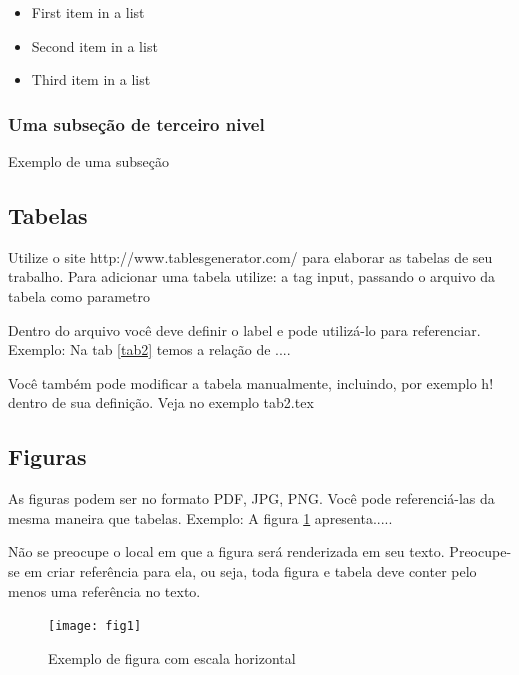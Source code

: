 \documentclass[	DIV=calc,%
							paper=a4,%
							fontsize=12pt,%
							onecolumn]{scrartcl}	 					%
\begin{document}
\begin{itemize}
	\item First item in a list 
	\item Second item in a list 
	\item Third item in a list
\end{itemize}

\subsubsection{Uma subseção de terceiro nivel}

Exemplo de uma subseção

\subsection{Tabelas}

Utilize o site http://www.tablesgenerator.com/ para elaborar as tabelas de seu trabalho.
Para adicionar uma tabela utilize: a tag input, passando o arquivo da tabela como parametro



Dentro do arquivo você deve definir o label e pode utilizá-lo para referenciar. Exemplo:
Na tab \ref{tab2} temos a relação de ....


Você também pode modificar a tabela manualmente, incluindo, por exemplo h! dentro de sua definição. Veja no exemplo tab2.tex

\subsection{Figuras}

As figuras podem ser no formato PDF, JPG, PNG. Você pode referenciá-las da mesma maneira que tabelas. Exemplo: A figura \ref{fig1} apresenta.....

Não se preocupe o local em que a figura será renderizada em seu texto. Preocupe-se em criar referência para ela, ou seja, toda figura e tabela deve conter pelo menos uma referência no texto.

\begin{figure}
\centering
\texttt{[image: fig1]}
\caption{Exemplo de figura com escala horizontal}
\label{fig1}
\end{figure}
\end{document}
